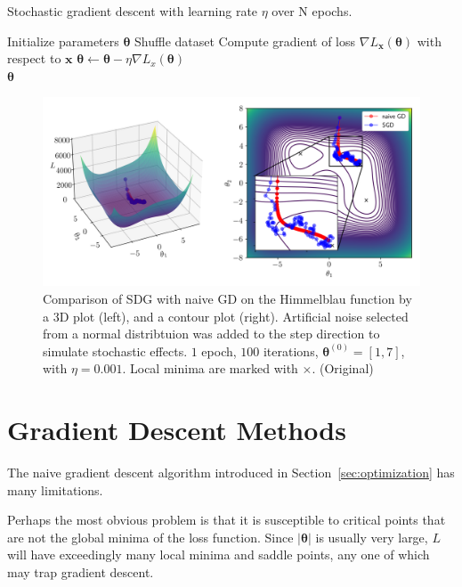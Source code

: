 \documentclass[12pt]{report}
\theoremstyle{definition}
\theoremstyle{remark}
\begin{document}
\begin{algorithm}
    \caption{Stochastic gradient descent with learning rate $\eta$ over N epochs.}\label{alg:sgd}
    \begin{algorithmic}[1]
        \State Initialize parameters $\boldsymbol{\theta}$
            \State Shuffle dataset
                \State Compute gradient of loss $\nabla L_\mathbf{x}(\boldsymbol{\theta})$ with respect to $\mathbf{x}$
                \State $\boldsymbol{\theta} \leftarrow \boldsymbol{\theta} - \eta \nabla L_x(\boldsymbol{\theta})$
            \EndFor
        \EndFor \\
        \Return $\boldsymbol{\theta}$
    \end{algorithmic}
\end{algorithm}
\begin{figure}[h]
    \centering
    \includegraphics[width=\linewidth]{figs/stochastic_comparison.png}
    \caption{Comparison of SDG with naive GD on the Himmelblau function by a 3D plot (left), and a contour plot (right). Artificial noise selected from a normal distribtuion was added to the step direction to simulate stochastic effects. $1$ epoch, $100$ iterations, $\boldsymbol{\theta}^{(0)} = [1,7]$, with $\eta = 0.001$. Local minima are marked with $\times$. (Original)}
    \label{fig:enter-label}
\end{figure}

\section{Gradient Descent Methods}\label{sec:gradient-descent-methods}

The naive gradient descent algorithm introduced in Section~\ref{sec:optimization} has many limitations.

Perhaps the most obvious problem is that it is susceptible to critical points that are not the global minima of the loss function. Since $|\boldsymbol{\theta}|$ is usually very large, $L$ will have exceedingly many local minima and saddle points, any one of which may trap gradient descent.
\end{document}

